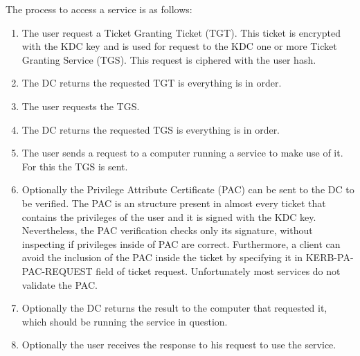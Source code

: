 \linej
The process to access a service is as follows\cite{tarlogic_theory}\cite{tarlogic_comprehension}\cite{events_1}:
\begin{enumerate}
	\item The user request a Ticket Granting Ticket (TGT). This ticket is encrypted with the KDC key and is used for request to the KDC one or more Ticket Granting Service (TGS). This request is ciphered with the user hash.
	\item The DC returns the requested TGT is everything is in order.
	\item The user requests the TGS.
	\item The DC returns the requested TGS is everything is in order.
	\item The user sends a request to a computer running a service to make use of it. For this the TGS is sent.
	\item Optionally the Privilege Attribute Certificate (PAC) can be sent to the DC to be verified. The PAC is an structure present in almost every ticket that contains the privileges of the user and it is signed with the KDC key. Nevertheless, the PAC verification checks only its signature, without inspecting if privileges inside of PAC are correct. Furthermore, a client can avoid the inclusion of the PAC inside the ticket by specifying it in KERB-PA-PAC-REQUEST field of ticket request. Unfortunately most services do not validate the PAC.
	\item Optionally the DC returns the result to the computer that requested it, which should be running the service in question.
	\item Optionally the user receives the response to his request to use the service.
\end{enumerate}

